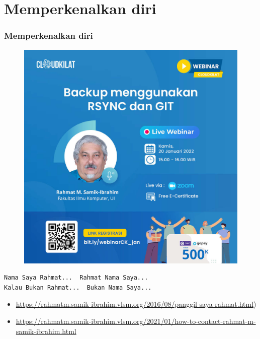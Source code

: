 \documentclass[xcolor=table, notheorems, hyperref={pdfpagelabels=false}]{beamer}
\begin{document}
\section{Memperkenalkan diri}
\begin{frame}[fragile]
\frametitle{Memperkenalkan diri}
\begin{figure}
\includegraphics[width=0.48\linewidth]{JPG-012}
\end{figure}
\begin{lstlisting}[basicstyle=\ttfamily\large]
Nama Saya Rahmat...  Rahmat Nama Saya...
Kalau Bukan Rahmat...  Bukan Nama Saya...
\end{lstlisting}
{\tiny
\begin{itemize}
\item \url{https://rahmatm.samik-ibrahim.vlsm.org/2016/08/panggil-saya-rahmat.html})
\item \url{https://rahmatm.samik-ibrahim.vlsm.org/2021/01/how-to-contact-rahmat-m-samik-ibrahim.html}
\end{itemize}
}
\end{frame}

\end{document}
